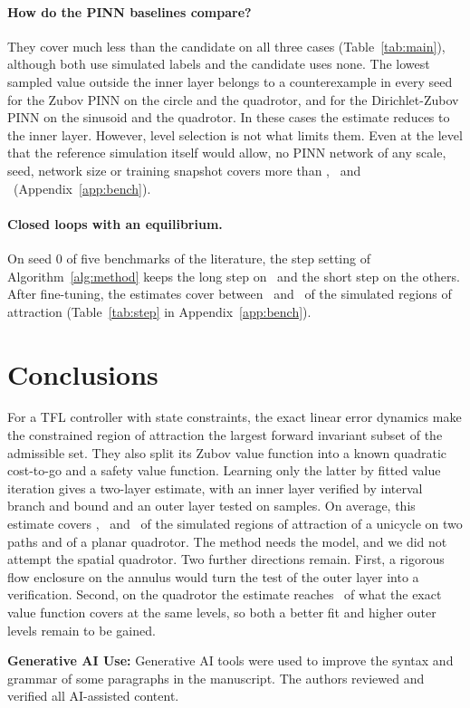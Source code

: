 \documentclass{l4dc2027}
\begin{document}
\paragraph{How do the PINN baselines compare?} They cover much less than the candidate on all three cases (Table~\ref{tab:main}), although both use simulated labels and the candidate uses none. The lowest sampled value outside the inner layer belongs to a counterexample in every seed for the Zubov PINN on the circle and the quadrotor, and for the Dirichlet-Zubov PINN on the sinusoid and the quadrotor. In these cases the estimate reduces to the inner layer. However, level selection is not what limits them. Even at the level that the reference simulation itself would allow, no PINN network of any scale, seed, network size or training snapshot covers more than \resOracleMaxCirc, \resOracleMaxSin\ and \resOracleMaxQuad\ (Appendix~\ref{app:bench}).

\vspace{-0.075in}

\paragraph{Closed loops with an equilibrium.} On seed 0 of five benchmarks of the literature, the step setting of Algorithm~\ref{alg:method} keeps the long step on \resStepBenchLong\ and the short step on the others. After fine-tuning, the estimates cover between \resStepBenchCovMin\ and \resStepBenchCovMax\ of the simulated regions of attraction (Table~\ref{tab:step} in Appendix~\ref{app:bench}).

\vspace{-0.1in}

\section{Conclusions}\label{sec:conclusion}
 For a TFL controller with state constraints, the exact linear error dynamics make the constrained region of attraction the largest forward invariant subset of the admissible set. They also split its Zubov value function into a known quadratic cost-to-go and a safety value function. Learning only the latter by fitted value iteration gives a two-layer estimate, with an inner layer verified by interval branch and bound and an outer layer tested on samples. On average, this estimate covers \resCovCircMean, \resCovSinMean\ and \resCovQuadMean\ of the simulated regions of attraction of a unicycle on two paths and of a planar quadrotor. The method needs the model, and we did not attempt the spatial quadrotor. Two further directions remain. First, a rigorous flow enclosure on the annulus would turn the test of the outer layer into a verification. Second, on the quadrotor the estimate reaches \resCeilFracQuad\ of what the exact value function covers at the same levels, so both a better fit and higher outer levels remain to be gained.

\noindent \textbf{Generative AI Use:} Generative AI tools were used to improve the syntax and grammar of some paragraphs in the manuscript. The authors reviewed and verified all AI-assisted content.



\appendix

\end{document}
